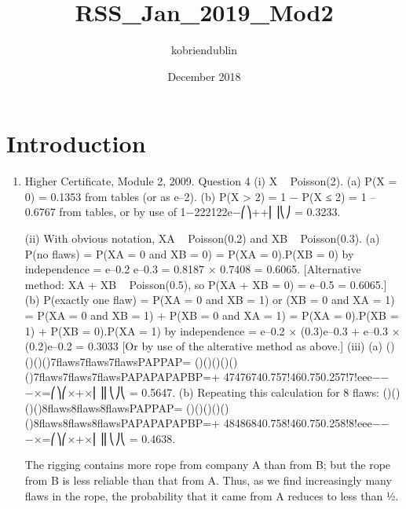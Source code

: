 \documentclass{article}
\title{RSS_Jan_2019_Mod2}
\author{kobriendublin }
\date{December 2018}
\begin{document}
\maketitle

\section{Introduction}

\begin{enumerate}
    \item Higher Certificate, Module 2, 2009. Question 4
(i) X ~ Poisson(2).
(a) P(X = 0) = 0.1353 from tables (or as e–2).
(b) P(X > 2) = 1 − P(X ≤ 2) = 1 – 0.6767 from tables, or by use of
1−222122e−⎛⎞++⎜⎟⎝⎠
= 0.3233.

(ii) With obvious notation, XA ~ Poisson(0.2) and XB ~ Poisson(0.3).
(a) P(no flaws) = P(XA = 0 and XB = 0)
= P(XA = 0).P(XB = 0) by independence
= e–0.2 e–0.3 = 0.8187 × 0.7408 = 0.6065.
[Alternative method: XA + XB ~ Poisson(0.5), so P(XA + XB = 0) = e–0.5 = 0.6065.]
(b) P(exactly one flaw) = P{(XA = 0 and XB = 1) or (XB = 0 and XA = 1)}
= P(XA = 0 and XB = 1) + P(XB = 0 and XA = 1)
= P(XA = 0).P(XB = 1) + P(XB = 0).P(XA = 1) by independence
= e–0.2 × (0.3)e–0.3 + e–0.3 × (0.2)e–0.2
= 0.3033 [Or by use of the alterative method as above.]
(iii) (a) ()()()()7flaws7flaws7flawsPAPPAP=
()()()()()()7flaws7flaws7flawsPAPAPAPAPBP=+
47476740.757!460.750.257!7!eee−−−×=⎛⎞⎛×+×⎜⎟⎜⎝⎠⎝ = 0.5647.
(b) Repeating this calculation for 8 flaws:
()()()()8flaws8flaws8flawsPAPPAP=
()()()()()()8flaws8flaws8flawsPAPAPAPAPBP=+
48486840.758!460.750.258!8!eee−−−×=⎛⎞⎛×+×⎜⎟⎜⎝⎠⎝ = 0.4638.

The rigging contains more rope from company A than from B; but the rope from B is less reliable than that from A. Thus, as we find increasingly many flaws in the rope, the probability that it came from A reduces to less than ½.
\end{enumerate}
\end{document}

